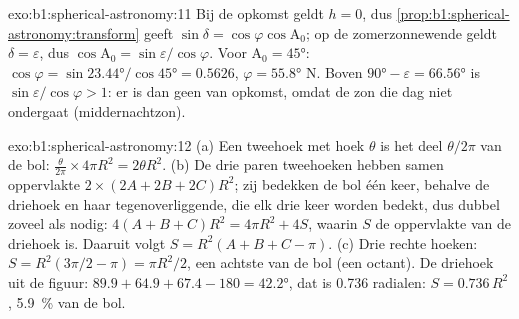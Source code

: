 \begin{solution}{exo:b1:spherical-astronomy:11}
Bij de opkomst geldt $h = 0$, dus \cref{prop:b1:spherical-astronomy:transform}
geeft $\sin\delta = \cos\varphi\cos\mathrm{A}_0$; op de zomerzonnewende geldt
$\delta = \varepsilon$, dus $\cos\mathrm{A}_0 = \sin\varepsilon/\cos\varphi$.
Voor $\mathrm{A}_0 = \ang{45}$: $\cos\varphi = \sin\ang{23.44}/\cos\ang{45} =
0.5626$, $\varphi = \ang{55.8}$ N. Boven $\ang{90} - \varepsilon =
\ang{66.56}$ is $\sin\varepsilon/\cos\varphi > 1$: er is dan geen  van
opkomst, omdat de zon die dag niet ondergaat (middernachtzon).
\end{solution}

\begin{solution}{exo:b1:spherical-astronomy:12}
(a) Een tweehoek met hoek $\theta$ is het deel $\theta/2\pi$ van de bol:
$\frac{\theta}{2\pi}\times4\pi R^2 = 2\theta R^2$. (b) De drie paren tweehoeken
hebben samen oppervlakte $2\times(2A + 2B + 2C)R^2$; zij bedekken de bol één
keer, behalve de driehoek en haar tegenoverliggende, die elk drie keer worden
bedekt, dus dubbel zoveel als nodig: $4(A + B + C)R^2 = 4\pi R^2 + 4S$, waarin
$S$ de oppervlakte van de driehoek is. Daaruit volgt $S = R^2(A + B + C - \pi)$.
(c) Drie rechte hoeken: $S = R^2(3\pi/2 - \pi) = \pi R^2/2$, een achtste van de
bol (een octant). De driehoek uit de figuur: $89.9 + 64.9 + 67.4 - 180 = \ang{42.2}$, dat is \num{0.736} radialen: $S = 0.736\,R^2$, \qty{5.9}{\percent}
van de bol.
\end{solution}

